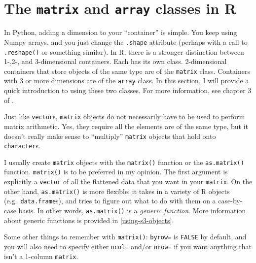 \documentclass[
  12pt,
]{krantz}
\begin{document}
\hypertarget{the-matrix-and-array-classes-in-r}{%
\section{\texorpdfstring{The \texttt{matrix} and \texttt{array} classes in R}{The matrix and array classes in R}}\label{the-matrix-and-array-classes-in-r}}

In Python, adding a dimension to your ``container'' is simple. You keep using Numpy arrays, and you just change the \texttt{.shape} attribute (perhaps with a call to \texttt{.reshape()} or something similar). In R, there is a stronger distinction between 1-,2-, and 3-dimensional containers. Each has its own class. 2-dimensional containers that store objects of the same type are of the \texttt{matrix} class. Containers with 3 or more dimensions are of the \texttt{array} class. In this section, I will provide a quick introduction to using these two classes. For more information, see chapter 3 of \citep{matloff_r_book}.

Just like \texttt{vector}s, \texttt{matrix} objects do not necessarily have to be used to perform matrix arithmetic. Yes, they require all the elements are of the same type, but it doesn't really make sense to ``multiply'' \texttt{matrix} objects that hold onto \texttt{character}s.

I usually create \texttt{matrix} objects with the \texttt{matrix()} function or the \texttt{as.matrix()} function. \texttt{matrix()} is to be preferred in my opinion. The first argument is explicitly a \texttt{vector} of all the flattened data that you want in your \texttt{matrix}. On the other hand, \texttt{as.matrix()} is more flexible; it takes in a variety of R objects (e.g.~\texttt{data.frame}s), and tries to figure out what to do with them on a case-by-case basis. In other words, \texttt{as.matrix()} is a \emph{generic function}. More information about generic functions is provided in \ref{using-s3-objects}.

Some other things to remember with \texttt{matrix()}: \texttt{byrow=} is \texttt{FALSE} by default, and you will also need to specify either \texttt{ncol=} and/or \texttt{nrow=} if you want anything that isn't a 1-column \texttt{matrix}.
\end{document}

